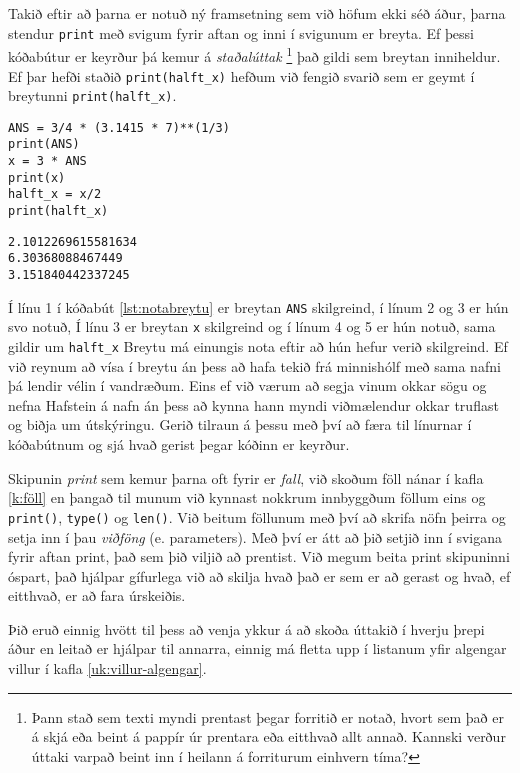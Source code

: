 Takið eftir að þarna er notuð ný framsetning sem við höfum ekki séð áður, þarna stendur \texttt{print} með svigum fyrir aftan og inni í svigunum er breyta.
Ef þessi kóðabútur er keyrður þá kemur á \textit{staðalúttak} \footnote{Þann stað sem texti myndi prentast þegar forritið er notað, hvort sem það er á skjá eða beint á pappír úr prentara eða eitthvað allt annað. Kannski verður úttaki varpað beint inn í heilann á forriturum einhvern tíma?} 
það gildi sem breytan inniheldur.
Ef þar hefði staðið \texttt{print(halft\_x)} hefðum við fengið svarið sem er geymt í breytunni \texttt{print(halft\_x)}.

\begin{lstlisting}[caption=Að nota breytu, label=lst:notabreytu]
ANS = 3/4 * (3.1415 * 7)**(1/3)
print(ANS)
x = 3 * ANS
print(x)
halft_x = x/2
print(halft_x)
\end{lstlisting}
\lstset{style=uttak}
\begin{lstlisting}
2.1012269615581634
6.30368088467449
3.151840442337245
\end{lstlisting}
\lstset{style=venjulegt}


Í línu 1 í kóðabút \ref{lst:notabreytu} er breytan \texttt{ANS} skilgreind, í línum 2 og 3 er hún svo notuð,
Í línu 3 er breytan \texttt{x} skilgreind og í línum 4 og 5 er hún notuð, sama gildir um \texttt{halft\_x}
Breytu má einungis nota eftir að hún hefur verið skilgreind.
Ef við reynum að vísa í breytu án þess að hafa tekið frá minnishólf með sama nafni þá lendir vélin í vandræðum.
Eins ef við værum að segja vinum okkar sögu og nefna Hafstein á nafn án þess að kynna hann myndi viðmælendur okkar truflast og biðja um útskýringu.
Gerið tilraun á þessu með því að færa til línurnar í kóðabútnum og sjá hvað gerist þegar kóðinn er keyrður.


Skipunin \emph{print} sem kemur þarna oft fyrir er \textit{fall}, við skoðum föll nánar í kafla \ref{k:föll} en þangað til munum við kynnast nokkrum innbyggðum föllum eins og \texttt{print()}, \texttt{type()} og \texttt{len()}.
Við beitum föllunum með því að skrifa nöfn þeirra og setja inn í þau \emph{viðföng} (e. parameters).
Með því er átt að þið setjið inn í svigana fyrir aftan print, það sem þið viljið að prentist.
Við megum beita print skipuninni óspart, það hjálpar gífurlega við að skilja hvað það er sem er að gerast og hvað, ef eitthvað, er að fara úrskeiðis.

Þið eruð einnig hvött til þess að venja ykkur á að skoða úttakið í hverju þrepi áður en leitað er hjálpar til annarra, einnig má fletta upp í listanum yfir algengar villur í kafla \ref{uk:villur-algengar}.


